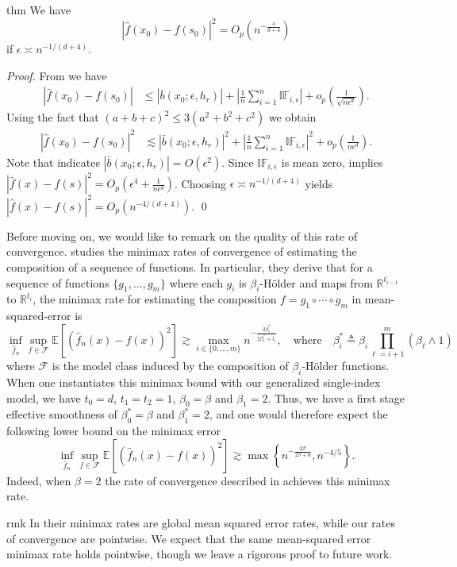 \documentclass[11pt]{article}
\begin{document}
\begin{restatable}{thm}{}  \label{regression risk}
    We have
    \[\left|\hat{f}(x_0) - f(s_0)\right|^2 = O_p\left(n^{-\frac{4}{d+4}}\right) \]
    if $\epsilon \asymp n^{-1/(d+4)}$.
\end{restatable}
\noindent \textit{Proof.} From  we have
\begin{align}
    \left|\hat{f}(x_0) - f(s_0)\right| &\leq\left|\bar{b}(x_0; \epsilon, h_r)\right| + \left|\frac{1}{n}\sum_{i = 1}^n\mathbb{IF}_{i, \epsilon} \right| + o_p\left(\frac{1}{\sqrt{n\epsilon^d}}\right).
\end{align}
Using the fact that $(a+b+c)^2 \leq 3(a^2 + b^2 + c^2)$ we obtain
\begin{align}
    \left|\hat{f}(x_0) - f(s_0)\right|^2 &\lesssim \left|\bar{b}(x_0; \epsilon, h_r)\right|^2 + \left|\frac{1}{n}\sum_{i = 1}^n\mathbb{IF}_{i, \epsilon}\right|^2 + o_p\left(\frac{1}{n\epsilon^d}\right).
\end{align}
Note that  indicates $|\bar{b}(x_0; \epsilon, h_r)| = O(\epsilon^2)$. Since $\mathbb{IF}_{i, \epsilon}$ is mean zero,  implies $|\hat{f}(x) - f(s)|^2 =  O_p(\epsilon^4 + \frac{1}{n\epsilon^d})$. Choosing $\epsilon \asymp n^{-1/(d+4)}$ yields $|\hat{f}(x) - f(s)|^2 = O_p(n^{-4/(d+4)}).$
\qed{}

Before moving on, we would like to remark on the quality of this rate of convergence. \citet{Schmidt_Hieber_2020} studies the minimax rates of convergence of estimating the composition of a sequence of functions. In particular, they derive that for a sequence of functions $\{g_1, \dots, g_m\}$ where each $g_i$ is $\beta_i$-H\"older and maps from $\mathbb{R}^{t_{i-1}}$ to $\mathbb{R}^{t_i}$, the minimax rate for estimating the composition $f = g_1 \circ \cdots \circ g_m$ in mean-squared-error is
\[ \inf_{\hat f_n } \sup_{f\in \mathcal{F}}  \mathbb{E}\left[(\hat f_n(x) - f(x))^2\right] \gtrsim \max_{i \in \{0, \dots, m\}} n^{-\frac{2\beta_i^*}{2\beta_i^* + t_i}}, \quad \text{where} \quad  \beta_i^* \triangleq \beta_i \prod_{\ell = i+1}^m(\beta_\ell \wedge 1)\]
where $\mathcal{F}$ is the model class induced by the composition of $\beta_i$-H\"older functions. When one instantiates this minimax bound with our generalized single-index model, we have $t_0 = d$, $t_1 = t_2 = 1$, $\beta_0 = \beta$ and $\beta_1 = 2$. Thus, we have a first stage effective smoothness of $\beta_0^* = \beta$ and $\beta_1^* = 2$, and one would therefore expect the following lower bound on the minimax error
\[\inf_{\hat f_n } \sup_{f\in \mathcal{F}}  \mathbb{E}\left[(\hat f_n(x) - f(x))^2\right] \gtrsim \max\left\{n^{-\frac{2\beta}{2\beta + d}}, n^{-4/5}\right\}.\]
Indeed, when $\beta = 2$ the rate of convergence described in   achieves this minimax rate. 
\begin{restatable}{rmk}{}
    In \citet{Schmidt_Hieber_2020} their minimax rates are global mean squared error rates, while our rates of convergence are pointwise. We expect that the same mean-squared error minimax rate holds pointwise, though we leave a rigorous proof to future work.
\end{restatable}
\end{document}
